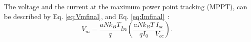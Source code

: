 \documentclass[review]{elsarticle}
\begin{document}
%
%
%
%
%
%
%
%
The voltage and the current at the maximum power point tracking (MPPT), can be described by Eq. \eqref{eq:Vmfinal}, and Eq. \eqref{eq:Imfinal}~\citep{Saloux}: %
\begin{equation}
\label{eq:Vmfinal}
V_{m}=\dfrac{aNk_{B}T}{q} ln \left( \dfrac{aNk_{B}T}{qI_{0}} \dfrac{I_{sc}}{V_{oc}}  \right). 
\end{equation}
\end{document}
